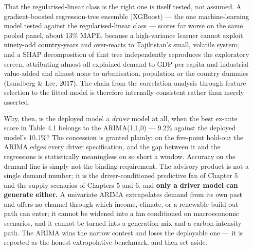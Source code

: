 \documentclass[10pt,twocolumn]{article}
\begin{document}
That the regularised-linear class is the right one is itself tested, not assumed. A gradient-boosted regression-tree ensemble (XGBoost) --- the one machine-learning model tested against the regularised-linear class --- scores far worse on the same pooled panel, about 13\% MAPE, because a high-variance learner cannot exploit ninety-odd country-years and over-reacts to Tajikistan's small, volatile system; and a SHAP decomposition of that tree independently reproduces the exploratory screen, attributing almost all explained demand to GDP per capita and industrial value-added and almost none to urbanisation, population or the country dummies (Lundberg \& Lee, 2017). The chain from the correlation analysis through feature selection to the fitted model is therefore internally consistent rather than merely asserted.

Why, then, is the deployed model a \textit{driver} model at all, when the best ex-ante score in Table 4.1 belongs to the ARIMA(1,1,0) --- 9.2\% against the deployed model's 10.1\%? The concession is granted plainly: on the five-point hold-out the ARIMA edges every driver specification, and the gap between it and the regressions is statistically meaningless on so short a window. Accuracy on the demand line is simply not the binding requirement. The advisory product is not a single demand number; it is the driver-conditioned predictive fan of Chapter 5 and the supply scenarios of Chapters 5 and 6, and \textbf{only a driver model can generate either.} A univariate ARIMA extrapolates demand from its own past and offers no channel through which income, climate, or a renewable build-out path can enter; it cannot be widened into a fan conditioned on macroeconomic scenarios, and it cannot be turned into a generation mix and a carbon-intensity path. The ARIMA wins the narrow contest and loses the deployable one --- it is reported as the honest extrapolative benchmark, and then set aside.
\end{document}
